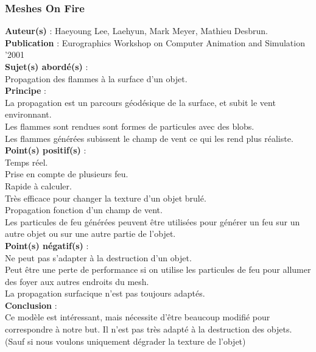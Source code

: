 \documentclass[a4paper,10pt]{article}
\begin{document}
\subsubsection{Meshes On Fire}
\textbf{Auteur(s)} : Haeyoung Lee, Laehyun, Mark Meyer, Mathieu Desbrun.\\
\textbf{Publication} : Eurographics Workshop on Computer Animation and Simulation '2001 \\
\textbf{Sujet(s) abordé(s)} : \\
	Propagation des flammes à la surface d'un objet.\\
\textbf{Principe} : \\
	La propagation est un parcours géodésique de la surface, et subit le vent environnant.\\	
	Les flammes sont rendues sont formes de particules avec des blobs.\\
	Les flammes générées subissent le champ de vent ce qui les rend plus réaliste.\\
\textbf{Point(s) positif(s)} :\\
	Temps réel.\\
	Prise en compte de plusieurs feu.\\
	Rapide à calculer.\\
	Très efficace pour changer la texture d'un objet brulé.\\
	Propagation fonction d'un champ de vent.\\
	Les particules de feu générées peuvent être utilisées pour générer un feu 
	sur un autre objet ou sur une autre partie de l'objet.\\
\textbf{Point(s) négatif(s)} :\\
	Ne peut pas s'adapter à la destruction d'un objet.\\
	Peut être une perte de performance si on utilise les particules de feu pour 
	allumer des foyer aux autres endroits du mesh.\\
	La propagation surfacique n'est pas toujours adaptés.\\	
\textbf{Conclusion} :\\
	Ce modèle est intéressant, mais nécessite d'être beaucoup modifié pour 
	correspondre à notre but. Il n'est pas très adapté à la destruction des objets. 
	(Sauf si nous voulons uniquement dégrader la texture de l'objet) \\
\end{document}
